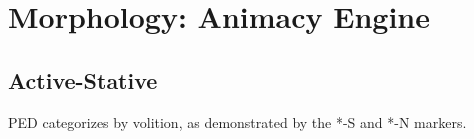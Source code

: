 \chapter{Morphology: Animacy Engine}\section{Active-Stative}PED categorizes by volition, as demonstrated by the *-S and *-N markers.